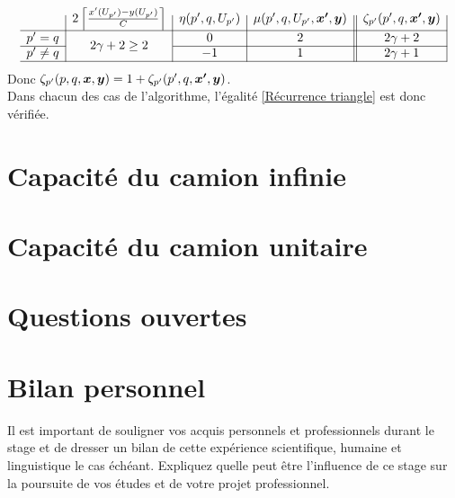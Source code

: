 \documentclass[twoside,11pt,openany,a4paper]{rapport}
\begin{document}
\begin{gather*}
  \begin{array}{c|c|c|c||c|}
    & 2 \left\lceil \frac{x'(U_{p'})-y(U_{p'})}{C} \right\rceil
    & \eta(p',q,U_{p'})
    & \mu(p',q,U_{p'},\bs{x'},\bs{y})
    & \zeta_{p'}(p',q,\bs{x'},\bs{y})
    \\ \hline
    p'=q
    & \multirow{2}{*}{$2 \gamma + 2 \ge 2$}
    & 0
    & 2
    & 2 \gamma + 2
    \\ \cline{1-1}\cline{3-5}
    p' \ne q
    &
    & -1
    & 1
    & 2\gamma + 1
    \\ \hline
  \end{array}
\end{gather*}
Donc $\zeta_{p'}(p,q,\boldsymbol{x},\boldsymbol{y}) = 1 + \zeta_{p'}(p',q,\boldsymbol{x'},\boldsymbol{y})$.
\\

Dans chacun des cas de l'algorithme, l'égalité \ref{Récurrence triangle} est donc vérifiée.

\chapter{Capacité du camion infinie}

\chapter{Capacité du camion unitaire}

\chapter{Questions ouvertes}

\chapter*{Bilan personnel}
Il est important de souligner vos acquis personnels et professionnels durant le stage et de  dresser un bilan de cette expérience scientifique, humaine et linguistique le cas échéant. Expliquez quelle peut être l’influence de ce stage sur la poursuite de vos études et de votre projet professionnel.




\backmatter
\end{document}
